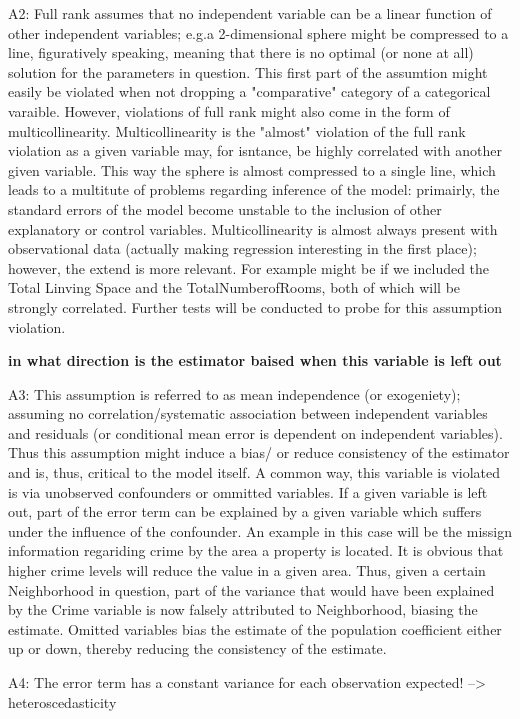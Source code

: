 \documentclass[a4paper]{article}
\begin{document}
\indent A2: Full rank assumes that no independent variable can be a linear function of other independent variables; e.g.a 2-dimensional sphere might be compressed to a line, figuratively speaking, meaning that there is no optimal (or none at all) solution for the parameters in question. This first part of the assumtion might easily be violated when not dropping a "comparative" category of a categorical varaible. However, violations of full rank might also come in the form of multicollinearity. Multicollinearity is the "almost" violation of the full rank violation as a given variable may, for isntance, be highly correlated with another given variable. This way the sphere is almost compressed to a single line, which leads to a multitute of problems regarding inference of the model: primairly, the standard errors of the model become unstable to the inclusion of other explanatory or control variables. Multicollinearity is almost always present with observational data (actually making regression interesting in the first place); however, the extend is more relevant. For example might be if we included the Total Linving Space and the TotalNumberofRooms, both of which will be strongly correlated. Further tests will be conducted to probe for this assumption violation. 


\textbf{in what direction is the estimator baised when this variable is left out}

A3: This assumption is referred to as mean independence (or exogeniety); assuming no correlation/systematic association between independent variables and residuals (or conditional mean error is dependent on independent variables). Thus this assumption might induce a bias/ or reduce consistency of the estimator and is, thus, critical to the model itself. A common way, this variable is violated is via unobserved confounders or ommitted variables. If a given variable is left out, part of the error term can be explained by a given variable which suffers under the influence of the confounder. An example in this case will be the missign information regariding crime by the area a property is located. It is obvious that higher crime levels will reduce the value in a given area. Thus, given a certain Neighborhood in question, part of the variance that would have been explained by the Crime variable is now falsely attributed to Neighborhood, biasing the estimate.
Omitted variables bias the estimate of the population coefficient  either up or down, thereby reducing the consistency of the estimate. 

A4: The error term has a constant variance for each observation expected! --> heteroscedasticity
\end{document}

